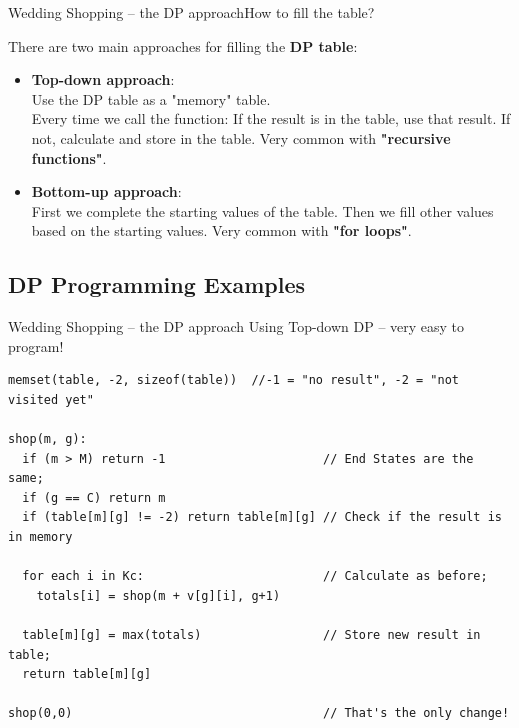 \begin{frame}{Wedding Shopping -- the DP approach}{How to fill the table?}

  There are two main approaches for filling the {\bf DP table}:
  \bigskip

  \begin{itemize}
  \item {\bf Top-down approach}: \\Use the DP table as a "memory" table.\\
  Every time we call the function: If the result is in the table, use that result. If not, calculate and store in the table. Very common with {\bf "recursive functions"}.
  \vfill

  \item {\bf Bottom-up approach}: \\
  First we complete the starting values of the table. Then we fill other values based on the starting values. Very common with {\bf "for loops"}.
  \end{itemize}
\end{frame}


\subsection{DP Programming Examples}

\begin{frame}[fragile]{Wedding Shopping -- the DP approach}
  {Using Top-down DP -- very easy to program!}

\begin{block}{}
{\smaller
\begin{verbatim}
memset(table, -2, sizeof(table))  //-1 = "no result", -2 = "not visited yet"

shop(m, g):
  if (m > M) return -1                      // End States are the same;
  if (g == C) return m
  if (table[m][g] != -2) return table[m][g] // Check if the result is in memory

  for each i in Kc:                         // Calculate as before;
    totals[i] = shop(m + v[g][i], g+1)

  table[m][g] = max(totals)                 // Store new result in table;
  return table[m][g]

shop(0,0)                                   // That's the only change!
\end{verbatim}}
\end{block}
\end{frame}

